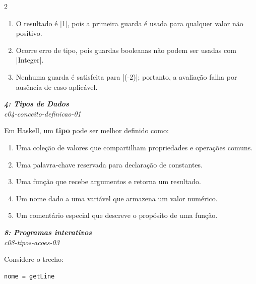 \documentclass[a4paper,10pt,brazil]{article}
\begin{document}
\begin{multicols}{2}
\begin{enumerate}
  \item O resultado é \haskellinline|1|, pois a primeira guarda é usada para qualquer valor não positivo.

  \item Ocorre erro de tipo, pois guardas booleanas não podem ser usadas com \haskellinline|Integer|.

  \item Nenhuma guarda é satisfeita para \haskellinline|(-2)|; portanto, a avaliação falha por ausência de caso aplicável.


\end{enumerate}

\begin{flushright}
  \footnotesize
  \textit{\textbf{4: Tipos de Dados}}\\
  \textit{c04-conceito-definicao-01}\\

\end{flushright}
Em Haskell, um \textbf{tipo} pode ser melhor definido como:

\begin{enumerate}
  \item Uma coleção de valores que compartilham propriedades e operações comuns.

  \item Uma palavra-chave reservada para declaração de constantes.

  \item Uma função que recebe argumentos e retorna um resultado.

  \item Um nome dado a uma variável que armazena um valor numérico.

  \item Um comentário especial que descreve o propósito de uma função.


\end{enumerate}

\begin{flushright}
  \footnotesize
  \textit{\textbf{8: Programas interativos}}\\
  \textit{c08-tipos-acoes-03}\\

\end{flushright}
Considere o trecho:

\begin{verbatim}
nome = getLine
\end{verbatim}


\end{multicols}
\end{document}
